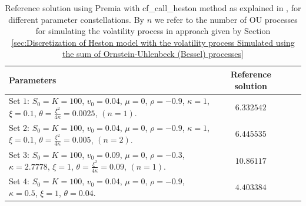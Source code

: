 \FloatBarrier
\begin{table}[!h]
	\centering
	\begin{small}
	\begin{tabular}{l*{2}{c}r}
	\toprule[1.5pt]
		Parameters            & Reference solution    \\
		\hline

			Set $1$:	 $S_0=K=100$, $v_0=0.04$, $\mu=0$,  $\rho=-0.9$, $\kappa=1$, $\xi=0.1$, $\theta=\frac{\xi^2}{4 \kappa}=0.0025$, $(n=1)$.  & $6.332542$  \\	
				Set $2$: $S_0=K=100$, $v_0=0.04$, $\mu=0$,  $\rho=-0.9$, $\kappa=1$, $\xi=0.1$, $\theta=\frac{\xi^2}{4 \kappa}=0.005$, $(n=2)$.  & $6.445535$  \\	
					Set $3$:	$S_0=K=100$, $v_0=0.09$, $\mu=0$,  $\rho=-0.3$, $\kappa=2.7778$, $\xi=1$, $\theta=\frac{\xi^2}{4 \kappa}=0.09$, $(n=1)$.  & $10.86117$   \\
						Set $4$:	$S_0=K=100$, $v_0=0.04$, $\mu=0$,  $\rho=-0.9$, $\kappa=0.5$, $\xi=1$, $\theta=0.04$.  & $4.403384$\\
	\bottomrule[1.25pt]
	\end{tabular}
\end{small}
	\caption{Reference solution using Premia with cf\_call\_heston method as explained in \cite{heston1993closed}, for different parameter constellations. By $n$ we refer to the number of OU processes for simulating the volatility process in approach given by Section \ref{sec:Discretization of Heston model with the volatility process Simulated using the sum of  Ornstein-Uhlenbeck (Bessel) processes}}
	\label{table:Reference solution, for different parameter constellations.}
\end{table}
\FloatBarrier

